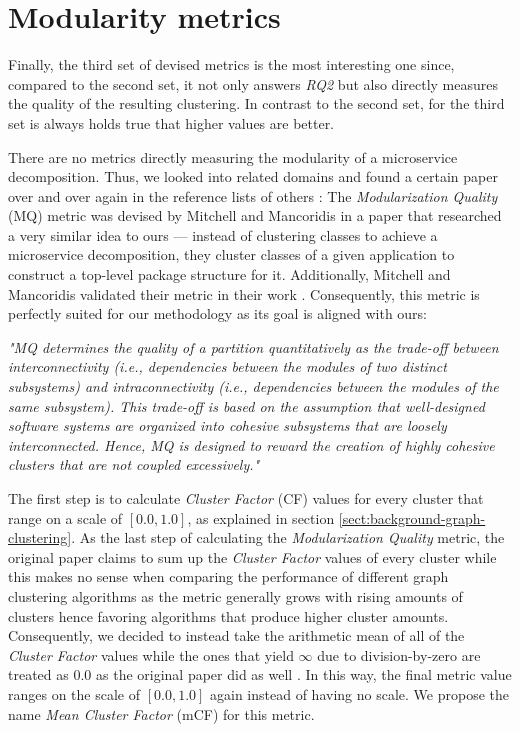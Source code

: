 \documentclass[12pt,a4paper]{report}
\begin{document}
\section{Modularity metrics}

Finally, the third set of devised metrics is the most interesting one since,
compared to the second set, it not only answers \textit{RQ2} but also directly
measures the quality of the resulting clustering.
In contrast to the second set, for the third set is always holds true that
higher values are better.

There are no metrics directly measuring the modularity of a microservice
decomposition. Thus, we looked into related domains and found a certain paper
over and over again in the reference lists of others
\cite{maqbool2007hierarchical, praditwong2010software, tsantalis2009identification,  jiang2006visualizing}:
The \textit{Modularization Quality} (MQ) metric was devised by Mitchell and Mancoridis
\cite{mitchell2006automatic} in a paper that researched a very similar idea to ours ---
instead of clustering classes to achieve a microservice decomposition, they cluster
classes of a given application to construct a top\hyp level package structure for it.
Additionally, Mitchell and Mancoridis validated their metric in their work
\cite{mitchell2006automatic}.
Consequently, this metric is perfectly suited for our methodology as its goal is aligned with ours:
\begin{displayquote}
\emph{"MQ determines the quality of a partition quantitatively as the trade-off
between interconnectivity (i.e., dependencies between the modules of two distinct
subsystems) and intraconnectivity (i.e., dependencies between the modules of
the same subsystem). This trade-off is based on the assumption that well-designed
software systems are organized into cohesive subsystems that are loosely interconnected.
Hence, MQ is designed to reward the creation of highly cohesive clusters that
are not coupled excessively."}~\cite{mitchell2006automatic}
\end{displayquote}

The first step is to calculate \textit{Cluster Factor} (CF) values for every cluster
that range on a scale of \([0.0, 1.0]\), as explained in section
\ref{sect:background-graph-clustering}.
As the last step of calculating the \textit{Modularization Quality} metric,
the original paper claims to sum up the \textit{Cluster Factor}
values of every cluster while this makes no sense when comparing the performance
of different graph clustering algorithms as the metric generally grows with
rising amounts of clusters hence favoring algorithms that produce higher cluster
amounts. Consequently, we decided to instead take the arithmetic mean of all of
the \textit{Cluster Factor} values while the ones that yield $\infty$ due to
division\hyp by\hyp zero are treated as $0.0$ as the original paper did as well
\cite{mitchell2006automatic}. In this way, the final metric value
ranges on the scale of \([0.0, 1.0]\) again instead of having no scale.
We propose the name \textit{Mean Cluster Factor} (mCF) for this metric.
\end{document}
